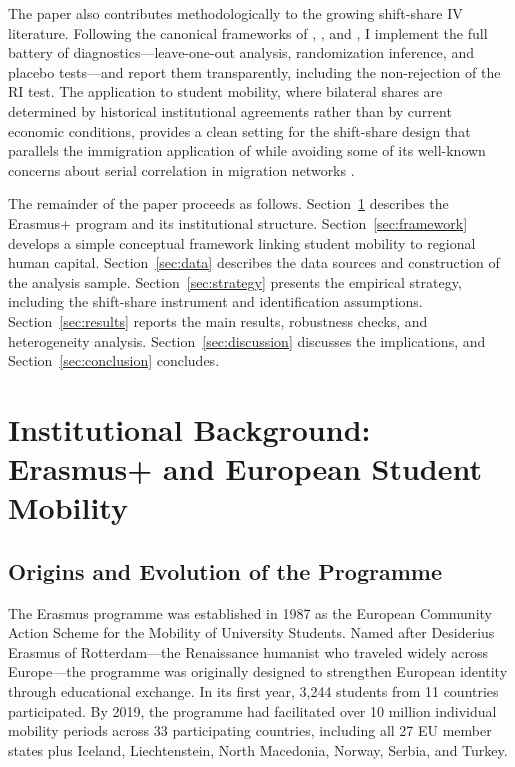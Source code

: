 \documentclass[12pt]{article}
\begin{document}
The paper also contributes methodologically to the growing shift-share IV literature. Following the canonical frameworks of \citet{borusyak_hull_jaravel_2022}, \citet{goldsmith_pinkham_sorkin_swift_2020}, and \citet{adao_kolesar_morales_2019}, I implement the full battery of diagnostics---leave-one-out analysis, randomization inference, and placebo tests---and report them transparently, including the non-rejection of the RI test. The application to student mobility, where bilateral shares are determined by historical institutional agreements rather than by current economic conditions, provides a clean setting for the shift-share design that parallels the immigration application of \citet{card_2001} while avoiding some of its well-known concerns about serial correlation in migration networks \citep{jaeger_ruist_stuhler_2024}.

The remainder of the paper proceeds as follows. Section~\ref{sec:background} describes the Erasmus+ program and its institutional structure. Section~\ref{sec:framework} develops a simple conceptual framework linking student mobility to regional human capital. Section~\ref{sec:data} describes the data sources and construction of the analysis sample. Section~\ref{sec:strategy} presents the empirical strategy, including the shift-share instrument and identification assumptions. Section~\ref{sec:results} reports the main results, robustness checks, and heterogeneity analysis. Section~\ref{sec:discussion} discusses the implications, and Section~\ref{sec:conclusion} concludes.


\section{Institutional Background: Erasmus+ and European Student Mobility}
\label{sec:background}

\subsection{Origins and Evolution of the Programme}

The Erasmus programme was established in 1987 as the European Community Action Scheme for the Mobility of University Students. Named after Desiderius Erasmus of Rotterdam---the Renaissance humanist who traveled widely across Europe---the programme was originally designed to strengthen European identity through educational exchange. In its first year, 3,244 students from 11 countries participated. By 2019, the programme had facilitated over 10 million individual mobility periods across 33 participating countries, including all 27 EU member states plus Iceland, Liechtenstein, North Macedonia, Norway, Serbia, and Turkey.
\end{document}
